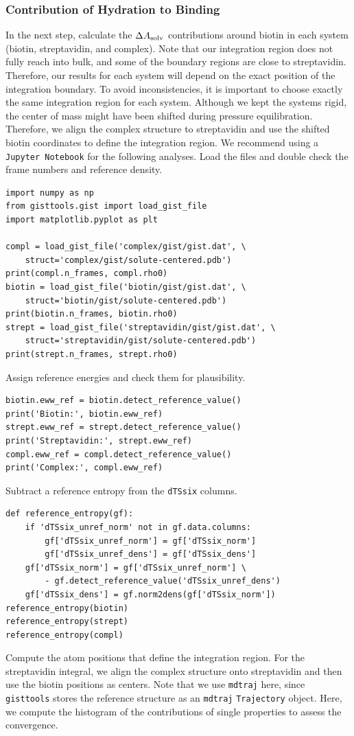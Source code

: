 \documentclass[9pt,tutorial]{livecoms}
\newcommand{\dasolv}{\Delta A_\textup{solv}}
\newcommand{\software}{\texttt}
\newcommand\inlinecode{\texttt}
\begin{document}
\subsubsection{Contribution of Hydration to Binding}
\label{sec:binding_contributions}
In the next step, calculate the $\dasolv$ contributions around biotin in each system (biotin, streptavidin, and complex).
Note that our integration region does not fully reach into bulk, and some of the boundary regions are close to streptavidin. 
Therefore, our results for each system will depend on the exact position of the integration boundary. 
To avoid inconsistencies, it is important to choose exactly the same integration region for each system.
Although we kept the systems rigid, the center of mass might have been shifted during pressure equilibration.
Therefore, we align the complex structure to streptavidin and use the shifted biotin coordinates to define the integration region.
We recommend using a \software{Jupyter Notebook} for the following analyses.
Load the files and double check the frame numbers and reference density.
\begin{lstlisting}[style=python]
import numpy as np
from gisttools.gist import load_gist_file
import matplotlib.pyplot as plt

compl = load_gist_file('complex/gist/gist.dat', \
    struct='complex/gist/solute-centered.pdb')
print(compl.n_frames, compl.rho0)
biotin = load_gist_file('biotin/gist/gist.dat', \
    struct='biotin/gist/solute-centered.pdb')
print(biotin.n_frames, biotin.rho0)
strept = load_gist_file('streptavidin/gist/gist.dat', \
    struct='streptavidin/gist/solute-centered.pdb')
print(strept.n_frames, strept.rho0)
\end{lstlisting}
Assign reference energies and check them for plausibility.

\begin{lstlisting}[style=python]
biotin.eww_ref = biotin.detect_reference_value()
print('Biotin:', biotin.eww_ref)
strept.eww_ref = strept.detect_reference_value()
print('Streptavidin:', strept.eww_ref)
compl.eww_ref = compl.detect_reference_value()
print('Complex:', compl.eww_ref)
\end{lstlisting}
Subtract a reference entropy from the \inlinecode{dTSsix} columns.

\begin{lstlisting}[style=python]
def reference_entropy(gf):
    if 'dTSsix_unref_norm' not in gf.data.columns:
        gf['dTSsix_unref_norm'] = gf['dTSsix_norm']
        gf['dTSsix_unref_dens'] = gf['dTSsix_dens']
    gf['dTSsix_norm'] = gf['dTSsix_unref_norm'] \
        - gf.detect_reference_value('dTSsix_unref_dens')
    gf['dTSsix_dens'] = gf.norm2dens(gf['dTSsix_norm'])
reference_entropy(biotin)
reference_entropy(strept)
reference_entropy(compl)
\end{lstlisting}
Compute the atom positions that define the integration region.
For the streptavidin integral, we align the complex structure onto streptavidin and then use the biotin positions as centers. Note that we use \software{mdtraj} here, since \software{gisttools} stores the reference structure as an \software{mdtraj} \inlinecode{Trajectory} object.
Here, we compute the histogram of the contributions of single properties to assess the convergence.
\end{document}
